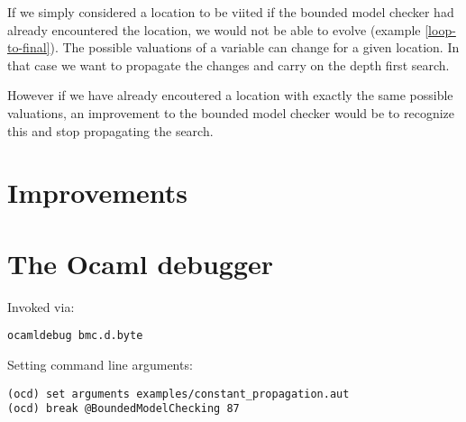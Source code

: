 \documentclass[letterpaper,12pt]{article}
\begin{document}
If we simply considered a location to be viited if the bounded model checker had already encountered the location, we would not be able to evolve (example \ref{loop-to-final}). The possible valuations of a variable can change for a given location. In that case we want to propagate the changes and carry on the depth first search. 

However if we have already encoutered a location with exactly the same possible valuations, an improvement to the bounded model checker would be to recognize this and stop propagating the search.

\section{Improvements}
\section{The Ocaml debugger}
Invoked via:
\begin{verbatim}
ocamldebug bmc.d.byte
\end{verbatim}
Setting command line arguments:
\begin{verbatim}
(ocd) set arguments examples/constant_propagation.aut
(ocd) break @BoundedModelChecking 87
\end{verbatim}
\end{document}
